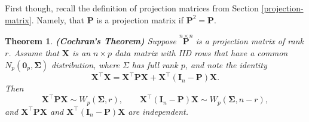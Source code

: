 \documentclass[]{book}
\newtheorem{theorem}{Theorem}[chapter]
\theoremstyle{definition}
\theoremstyle{definition}
\theoremstyle{definition}
\theoremstyle{remark}
\begin{document}
First though, recall the definition of projection matrices from Section \ref{projection-matrix}. Namely, that \(\boldsymbol P\) is a projection matrix if \(\boldsymbol P^2=\boldsymbol P\).

\begin{theorem}
\protect\hypertarget{thm:six11}{}{\label{thm:six11} }\textbf{(Cochran's Theorem)} Suppose \(\stackrel{n \times n}{\mathbf P}\) is a projection matrix of rank \(r\). Assume that \(\boldsymbol X\) is an \(n \times p\) data matrix with IID rows that have a common \(N_p({\mathbf 0}_p, \boldsymbol \Sigma)\) distribution, where \(\Sigma\) has full rank \(p\), and note the identity
\begin{equation}
\boldsymbol X^\top \boldsymbol X= \boldsymbol X^\top {\mathbf P} \boldsymbol X+ \boldsymbol X^\top ({\mathbf I}_n -{\mathbf P})\boldsymbol X.
\label{eq:Cochran1}
\end{equation}
Then
\begin{equation}
\boldsymbol X^\top {\mathbf P} \boldsymbol X\sim W_p(\boldsymbol \Sigma, r), \qquad  \boldsymbol X^\top ({\mathbf I}_n -{\mathbf P})\boldsymbol X\sim W_p(\boldsymbol \Sigma, n-r),
\label{eq:Cochran2}
\end{equation}
and \(\boldsymbol X^\top {\mathbf P} \boldsymbol X\) and \(\boldsymbol X^\top ({\mathbf I}_n -{\mathbf P})\boldsymbol X\)
are independent.
\end{theorem}
\end{document}
